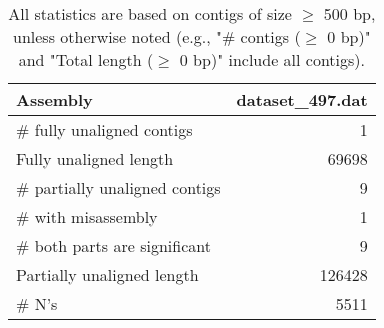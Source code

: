 \documentclass[12pt,a4paper]{article}
\begin{document}
\begin{table}[ht]
\begin{center}
\caption{All statistics are based on contigs of size $\geq$ 500 bp, unless otherwise noted (e.g., "\# contigs ($\geq$ 0 bp)" and "Total length ($\geq$ 0 bp)" include all contigs).}
\begin{tabular}{|l*{1}{|r}|}
\hline
Assembly & dataset\_497.dat \\ \hline
\# fully unaligned contigs & 1 \\ \hline
Fully unaligned length & 69698 \\ \hline
\# partially unaligned contigs & 9 \\ \hline
\hspace{5mm}\# with misassembly & 1 \\ \hline
\hspace{5mm}\# both parts are significant & 9 \\ \hline
Partially unaligned length & 126428 \\ \hline
\# N's & 5511 \\ \hline
\end{tabular}
\end{center}
\end{table}
\end{document}
